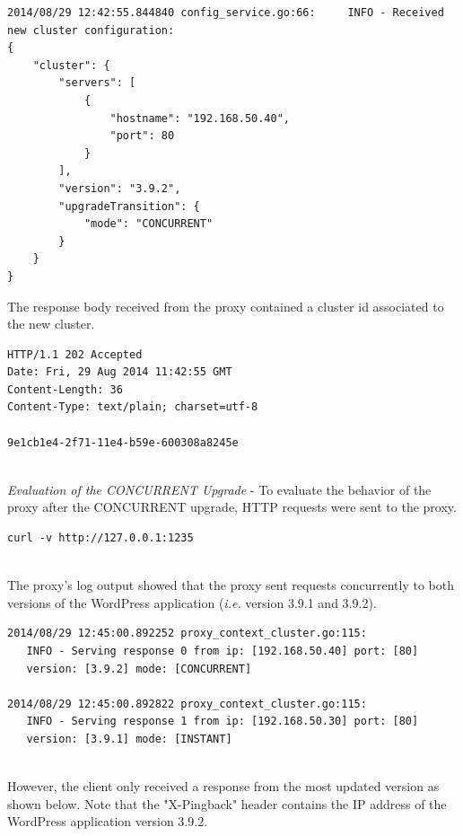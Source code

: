 \documentclass[a4paper,11pt,twoside]{report}
\begin{document}
\begin{lstlisting}[language=terminal]
2014/08/29 12:42:55.844840 config_service.go:66:     INFO - Received new cluster configuration:
{
    "cluster": {
        "servers": [
            {
                "hostname": "192.168.50.40", 
                "port": 80
            }
        ], 
        "version": "3.9.2", 
        "upgradeTransition": {
            "mode": "CONCURRENT"
        }
    }
} 
\end{lstlisting} 

\noindent
The response body received from the proxy contained a cluster id associated to the new cluster.\smallskip

\begin{lstlisting}[language=terminal]
HTTP/1.1 202 Accepted
Date: Fri, 29 Aug 2014 11:42:55 GMT
Content-Length: 36
Content-Type: text/plain; charset=utf-8

9e1cb1e4-2f71-11e4-b59e-600308a8245e
\end{lstlisting} 

\noindent\\
\textit{Evaluation of the CONCURRENT Upgrade} - To evaluate the behavior of the proxy after the CONCURRENT upgrade, HTTP requests were sent to the proxy. \smallskip

\begin{lstlisting}[language=terminal]
curl -v http://127.0.0.1:1235
\end{lstlisting}

\noindent\\ 
The proxy's log output showed that the proxy sent requests concurrently to both versions of the WordPress application (\textit{i.e.} version 3.9.1 and 3.9.2). \smallskip 

\begin{lstlisting}[language=terminal]
2014/08/29 12:45:00.892252 proxy_context_cluster.go:115:     
   INFO - Serving response 0 from ip: [192.168.50.40] port: [80] 
   version: [3.9.2] mode: [CONCURRENT]

2014/08/29 12:45:00.892822 proxy_context_cluster.go:115:     
   INFO - Serving response 1 from ip: [192.168.50.30] port: [80] 
   version: [3.9.1] mode: [INSTANT]
\end{lstlisting}

\noindent\\
However, the client only received a response from the most updated version as shown below. Note that the "X-Pingback" header contains the IP address of the WordPress application version 3.9.2. \smallskip
\end{document}
